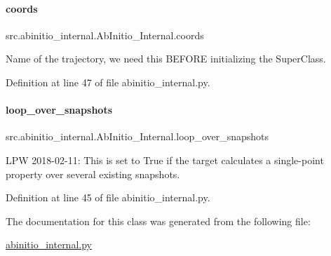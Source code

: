 \paragraph{\texorpdfstring{coords}{coords}}
{\footnotesize\ttfamily src.\+abinitio\+\_\+internal.\+Ab\+Initio\+\_\+\+Internal.\+coords}



Name of the trajectory, we need this B\+E\+F\+O\+RE initializing the Super\+Class. 



Definition at line 47 of file abinitio\+\_\+internal.\+py.

\mbox{\label{classsrc_1_1abinitio__internal_1_1AbInitio__Internal_a1b4e68c1db6ca2b90883340aa40cdf46}} 
\paragraph{\texorpdfstring{loop\+\_\+over\+\_\+snapshots}{loop\_over\_snapshots}}
{\footnotesize\ttfamily src.\+abinitio\+\_\+internal.\+Ab\+Initio\+\_\+\+Internal.\+loop\+\_\+over\+\_\+snapshots}



L\+PW 2018-\/02-\/11\+: This is set to True if the target calculates a single-\/point property over several existing snapshots. 



Definition at line 45 of file abinitio\+\_\+internal.\+py.



The documentation for this class was generated from the following file\+:\begin{DoxyCompactItemize}
\item 
\hyperlink{abinitio__internal_8py}{abinitio\+\_\+internal.\+py}\end{DoxyCompactItemize}
